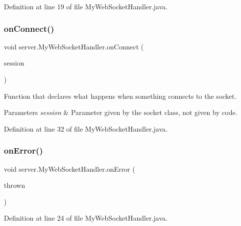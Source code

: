 Definition at line 19 of file My\+Web\+Socket\+Handler.\+java.

\hypertarget{classserver_1_1_my_web_socket_handler_aeff7fa4f5f0e42526174016f05101ba4}{}\label{classserver_1_1_my_web_socket_handler_aeff7fa4f5f0e42526174016f05101ba4} 
\subsubsection{\texorpdfstring{on\+Connect()}{onConnect()}}
{\footnotesize\ttfamily void server.\+My\+Web\+Socket\+Handler.\+on\+Connect (\begin{DoxyParamCaption}\item[{Session}]{session }\end{DoxyParamCaption})}

Function that declares what happens when something connects to the socket. 
\begin{DoxyParams}{Parameters}
{\em session} & Parameter given by the socket class, not given by code. \\
\hline
\end{DoxyParams}


Definition at line 32 of file My\+Web\+Socket\+Handler.\+java.

\hypertarget{classserver_1_1_my_web_socket_handler_ab232bcea3e901fe731840e6de8c1544b}{}\label{classserver_1_1_my_web_socket_handler_ab232bcea3e901fe731840e6de8c1544b} 
\subsubsection{\texorpdfstring{on\+Error()}{onError()}}
{\footnotesize\ttfamily void server.\+My\+Web\+Socket\+Handler.\+on\+Error (\begin{DoxyParamCaption}\item[{Throwable}]{thrown }\end{DoxyParamCaption})}



Definition at line 24 of file My\+Web\+Socket\+Handler.\+java.

\hypertarget{classserver_1_1_my_web_socket_handler_ad10604d60be64a1af67abba528769fd7}{}\label{classserver_1_1_my_web_socket_handler_ad10604d60be64a1af67abba528769fd7} 
